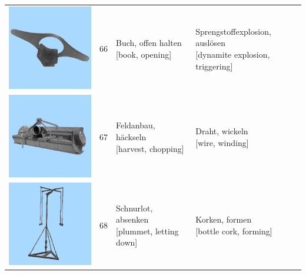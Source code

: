 \documentclass[
  english,
  man,floatsintext]{apa7}
\begin{document}
\begin{center}
\begin{ThreePartTable}
{\begin{longtable}{llll}
\includegraphics[valign=c, scale=0.23]{../materials/unfamiliar/66.png} & 66 & \makecell[l]{Buch, offen halten\\{[book, opening]}} & \makecell[l]{Sprengstoffexplosion, auslösen\\{[dynamite explosion, triggering]}}\\
\includegraphics[valign=c, scale=0.23]{../materials/unfamiliar/67.png} & 67 & \makecell[l]{Feldanbau, häckseln\\{[harvest, chopping]}} & \makecell[l]{Draht, wickeln\\{[wire, winding]}}\\
\includegraphics[valign=c, scale=0.23]{../materials/unfamiliar/68.png} & 68 & \makecell[l]{Schnurlot, absenken\\{[plummet, letting down]}} & \makecell[l]{Korken, formen\\{[bottle cork, forming]}}\\

\end{longtable}}
\end{ThreePartTable}
\end{center}
\end{document}
